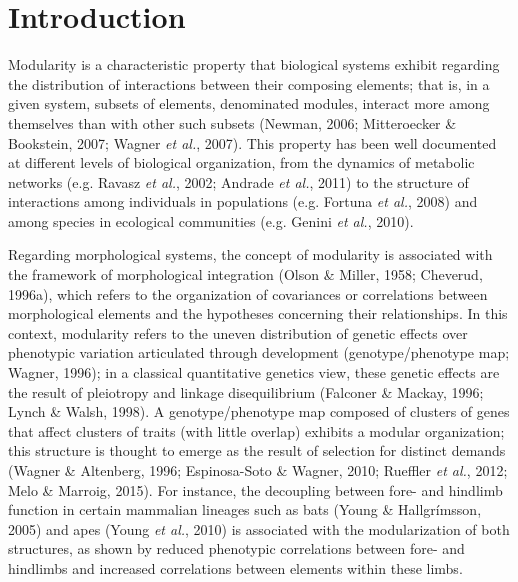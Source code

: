 \documentclass[12pt,twoside]{report}
\begin{document}
\section{Introduction}\label{introduction}

Modularity is a characteristic property that biological systems exhibit
regarding the distribution of interactions between their composing
elements; that is, in a given system, subsets of elements, denominated
modules, interact more among themselves than with other such subsets
(Newman, 2006; Mitteroecker \& Bookstein, 2007; Wagner \emph{et al.},
2007). This property has been well documented at different levels of
biological organization, from the dynamics of metabolic networks (e.g.
Ravasz \emph{et al.}, 2002; Andrade \emph{et al.}, 2011) to the
structure of interactions among individuals in populations (e.g. Fortuna
\emph{et al.}, 2008) and among species in ecological communities (e.g.
Genini \emph{et al.}, 2010).

Regarding morphological systems, the concept of modularity is associated
with the framework of morphological integration (Olson \& Miller, 1958;
Cheverud, 1996a), which refers to the organization of covariances or
correlations between morphological elements and the hypotheses
concerning their relationships. In this context, modularity refers to
the uneven distribution of genetic effects over phenotypic variation
articulated through development (genotype/phenotype map; Wagner, 1996);
in a classical quantitative genetics view, these genetic effects are the
result of pleiotropy and linkage disequilibrium (Falconer \& Mackay,
1996; Lynch \& Walsh, 1998). A genotype/phenotype map composed of
clusters of genes that affect clusters of traits (with little overlap)
exhibits a modular organization; this structure is thought to emerge as
the result of selection for distinct demands (Wagner \& Altenberg, 1996;
Espinosa-Soto \& Wagner, 2010; Rueffler \emph{et al.}, 2012; Melo \&
Marroig, 2015). For instance, the decoupling between fore- and hindlimb
function in certain mammalian lineages such as bats (Young \&
Hallgrímsson, 2005) and apes (Young \emph{et al.}, 2010) is associated
with the modularization of both structures, as shown by reduced
phenotypic correlations between fore- and hindlimbs and increased
correlations between elements within these limbs.
\end{document}
